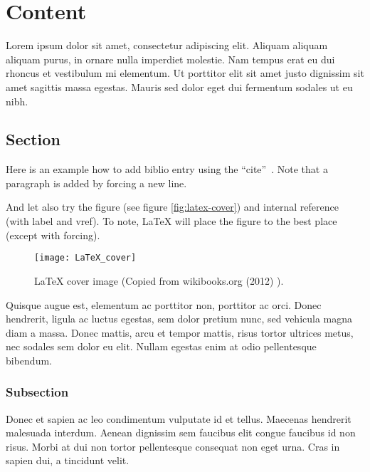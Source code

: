 \documentclass[11pt,a4paper,oneside]{memoir}
\begin{document}



\setcounter{page}{1} %


\chapter{Content}
Lorem ipsum dolor sit amet, consectetur adipiscing elit. Aliquam aliquam aliquam purus, in ornare nulla imperdiet molestie. Nam tempus erat eu dui rhoncus et vestibulum mi elementum. Ut porttitor elit sit amet justo dignissim sit amet sagittis massa egestas. Mauris sed dolor eget dui fermentum sodales ut eu nibh. 

\section{Section}
Here is an example how to add biblio entry \cite{kopka:guide} using the \textquotedblleft cite\textquotedblright ~\cite[section 4.2]{tobias:book}. Note that a paragraph is added by forcing a new line.

And let also try the figure (see figure \vref{fig:latex-cover}) and internal reference (with label and vref). To note, \LaTeX{} will place the figure to the best place (except with forcing).
\begin{figure}[h]
    \centering
    \texttt{[image: LaTeX\_cover]}
    \caption{\LaTeX{} cover image (Copied from wikibooks.org (2012) \cite{wikibooks:latex}).}
    \label{fig:latex-cover}
\end{figure}

Quisque augue est, elementum ac porttitor non, porttitor ac orci. Donec hendrerit, ligula ac luctus egestas, sem dolor pretium nunc, sed vehicula magna diam a massa. Donec mattis, arcu et tempor mattis, risus tortor ultrices metus, nec sodales sem dolor eu elit. Nullam egestas enim at odio pellentesque bibendum. 

\subsection{Subsection}
Donec et sapien ac leo condimentum vulputate id et tellus. Maecenas hendrerit malesuada interdum. Aenean dignissim sem faucibus elit congue faucibus id non risus. Morbi at dui non tortor pellentesque consequat non eget urna. Cras in sapien dui, a tincidunt velit.
\end{document}
